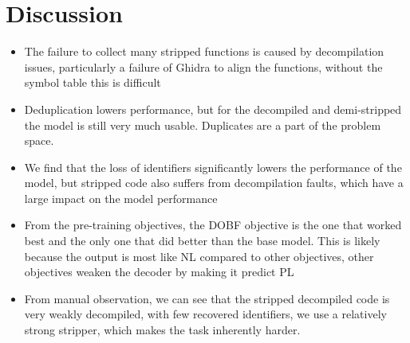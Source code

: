 \chapter{Discussion}
\label{discussion}
\begin{itemize}
    \item The failure to collect many stripped functions is caused by decompilation issues, particularly a failure of Ghidra to align the functions, without the symbol table this is difficult
    \item Deduplication lowers performance, but for the decompiled and demi-stripped the model is still very much usable. Duplicates are a part of the problem space.
    \item We find that the loss of identifiers significantly lowers the performance of the model, but stripped code also suffers from decompilation faults, which have a large impact on the model performance
    \item From the pre-training objectives, the DOBF objective is the one that worked best and the only one that did better than the base model. This is likely because the output is most like NL compared to other objectives, other objectives weaken the decoder by making it predict PL
    \item From manual observation, we can see that the stripped decompiled code is very weakly decompiled, with few recovered identifiers, we use a relatively strong stripper, which makes the task inherently harder.
\end{itemize}